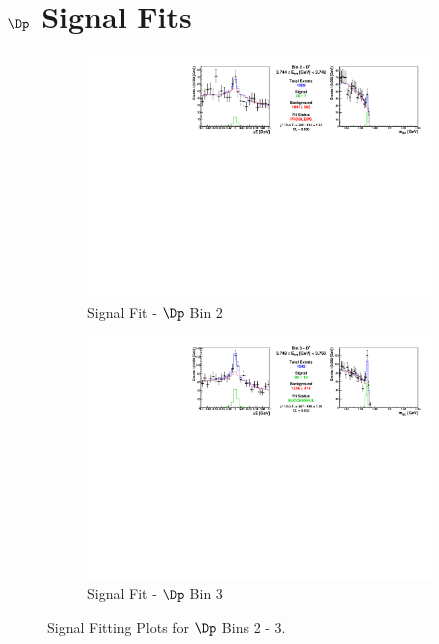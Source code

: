 \chapter{$\Dp$ Signal Fits}
\label{app:Dp_signal_fits}

\begin{figure}[h]

\begin{subfigure}[c]{0.99\textwidth}
\includegraphics[width=\textwidth]{figures/plots/fit_results/Dp_bin_02.pdf}
\caption*{Signal Fit - $\Dp$ Bin 2}
\end{subfigure}

\vspace{5pt}

\begin{subfigure}[c]{0.99\textwidth}
\includegraphics[width=\textwidth]{figures/plots/fit_results/Dp_bin_03.pdf}
\caption*{Signal Fit - $\Dp$ Bin 3}
\end{subfigure}

\caption{Signal Fitting Plots for $\Dp$ Bins 2 - 3.}
\label{fig:Dp_plots_2_3}

\end{figure}


